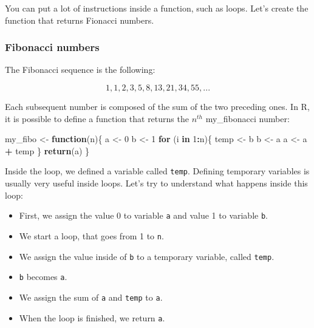 \documentclass[]{gitbook}
\newenvironment{Shaded}{\begin{snugshade}}{\end{snugshade}}
\newcommand{\ControlFlowTok}[1]{\textcolor[rgb]{0.13,0.29,0.53}{\textbf{#1}}}
\newcommand{\DecValTok}[1]{\textcolor[rgb]{0.00,0.00,0.81}{#1}}
\newcommand{\KeywordTok}[1]{\textcolor[rgb]{0.13,0.29,0.53}{\textbf{#1}}}
\newcommand{\NormalTok}[1]{#1}
\newcommand{\OperatorTok}[1]{\textcolor[rgb]{0.81,0.36,0.00}{\textbf{#1}}}
\newcommand{\StringTok}[1]{\textcolor[rgb]{0.31,0.60,0.02}{#1}}
\providecommand{\tightlist}{%
  \setlength{\itemsep}{0pt}\setlength{\parskip}{0pt}}
\theoremstyle{definition}
\theoremstyle{definition}
\theoremstyle{definition}
\theoremstyle{remark}
\begin{document}
You can put a lot of instructions inside a function, such as loops.
Let's create the function that returns Fionacci numbers.

\hypertarget{fibonacci-numbers}{%
\subsubsection{Fibonacci numbers}\label{fibonacci-numbers}}

The Fibonacci sequence is the following:

\[1, 1, 2, 3, 5, 8, 13, 21, 34, 55, ...\]

Each subsequent number is composed of the sum of the two preceding ones.
In R, it is possible to define a function that returns the \(n^{th}\)
my\_fibonacci number:

\begin{Shaded}
\begin{Highlighting}[]
\NormalTok{my_fibo <-}\StringTok{ }\ControlFlowTok{function}\NormalTok{(n)\{}
\NormalTok{ a <-}\StringTok{ }\DecValTok{0}
\NormalTok{ b <-}\StringTok{ }\DecValTok{1}
 \ControlFlowTok{for}\NormalTok{ (i }\ControlFlowTok{in} \DecValTok{1}\OperatorTok{:}\NormalTok{n)\{}
\NormalTok{  temp <-}\StringTok{ }\NormalTok{b}
\NormalTok{  b <-}\StringTok{ }\NormalTok{a}
\NormalTok{  a <-}\StringTok{ }\NormalTok{a }\OperatorTok{+}\StringTok{ }\NormalTok{temp}
\NormalTok{ \}}
 \KeywordTok{return}\NormalTok{(a)}
\NormalTok{\}}
\end{Highlighting}
\end{Shaded}

Inside the loop, we defined a variable called \texttt{temp}. Defining
temporary variables is usually very useful inside loops. Let's try to
understand what happens inside this loop:

\begin{itemize}
\tightlist
\item
  First, we assign the value 0 to variable \texttt{a} and value 1 to
  variable \texttt{b}.
\item
  We start a loop, that goes from 1 to \texttt{n}.
\item
  We assign the value inside of \texttt{b} to a temporary variable,
  called \texttt{temp}.
\item
  \texttt{b} becomes \texttt{a}.
\item
  We assign the sum of \texttt{a} and \texttt{temp} to \texttt{a}.
\item
  When the loop is finished, we return \texttt{a}.
\end{itemize}
\end{document}
